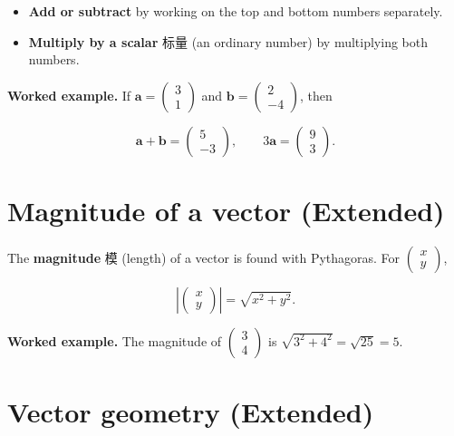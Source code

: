 \documentclass[11pt]{article}
\begin{document}
\begin{itemize}
\item \textbf{Add or subtract} by working on the top and bottom numbers separately.

\item \textbf{Multiply by a scalar} 标量 (an ordinary number) by multiplying both numbers.

\end{itemize}

\textbf{Worked example.} If $\mathbf{a} = \begin{pmatrix} 3 \\ 1 \end{pmatrix}$ and $\mathbf{b} = \begin{pmatrix} 2 \\ -4 \end{pmatrix}$, then

\[
\mathbf{a} + \mathbf{b} = \begin{pmatrix} 5 \\ -3 \end{pmatrix}, \qquad 3\mathbf{a} = \begin{pmatrix} 9 \\ 3 \end{pmatrix}.
\]

\section*{Magnitude of a vector (Extended)}

The \textbf{magnitude} 模 (length) of a vector is found with Pythagoras. For $\begin{pmatrix} x \\ y \end{pmatrix}$,

\[
\left| \begin{pmatrix} x \\ y \end{pmatrix} \right| = \sqrt{x^{2} + y^{2}}.
\]

\textbf{Worked example.} The magnitude of $\begin{pmatrix} 3 \\ 4 \end{pmatrix}$ is $\sqrt{3^{2} + 4^{2}} = \sqrt{25} = 5$.

\section*{Vector geometry (Extended)}
\end{document}
